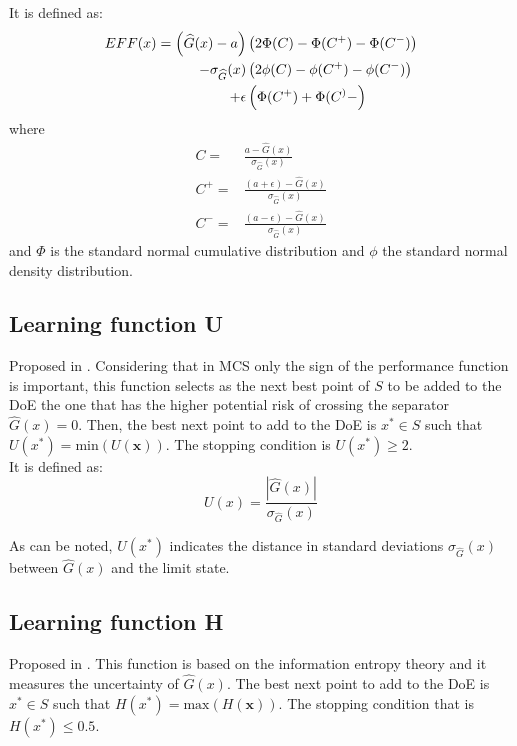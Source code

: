It is defined as:
\begin{align}
    EFF(x)= \left( \widehat{G}(x) - a \right)& \left( 2 \Phi (C) - \Phi (C^+) - \Phi (C^-) \right) \nonumber\\
- \sigma_{\widehat{G}}(x) & \left( 2 \phi (C) - \phi (C^+) - \phi (C^-) \right) \\
+ \epsilon & \left( \Phi (C^+) + \Phi (C^)- \right)\nonumber
\end{align}
where
\begin{align*}
    C =& \frac{a-\widehat{G}(x)}{\sigma_{\widehat{G}}(x)} \\
    C^+ =& \frac{(a + \epsilon)-\widehat{G}(x)}{\sigma_{\widehat{G}}(x)} \\
    C^- =& \frac{(a - \epsilon)-\widehat{G}(x)}{\sigma_{\widehat{G}}(x)}
\end{align*}
and $\Phi$ is the standard normal cumulative distribution and $\phi$ the standard
normal density distribution. \\


\subsection{Learning function U}

Proposed in \citep{Echard2011}. Considering that in MCS only the sign of the performance
function is important, this function selects as the next best point of $S$ to be added
to the DoE the one that has the higher potential risk of crossing the separator 
$ \widehat{G}(x) = 0$. Then, the best next point to add to the DoE is $x^* \in S$ such that
$U(x^*) =\text{min}(U(\bm{x}))$. The stopping condition is $U(x^*) \geq 2$. \\

It is defined as: 
\begin{equation}
    U(x) = \frac{\left\lvert \widehat{G}(x)\right\rvert }{\sigma_{\widehat{G}}(x)}
\end{equation}

As can be noted, $U(x^*)$ indicates the distance in standard deviations $\sigma_{\widehat{G}}(x)$ between $\widehat{G}(x)$ and the limit state. 

\subsection{Learning function H}

Proposed in \citep{Lv2015}. This function is based on the information entropy theory and 
it measures the uncertainty of $\widehat{G}(x)$. The best next point to add to the DoE is
$x^* \in S$ such that $H(x^*) =\text{max}(H(\bm{x}))$. The stopping
condition that is $H(x^*) \leq 0.5$. \\

